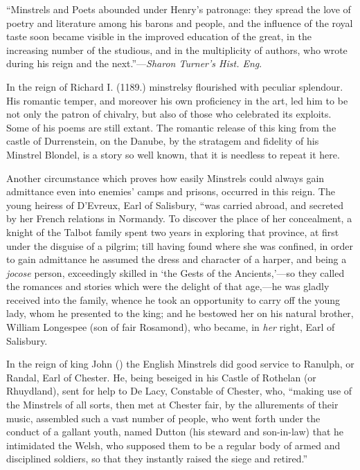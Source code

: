 “Minstrels and Poets abounded under Henry’s patronage: they spread the love
of poetry and literature among his barons and people, and the influence of the
royal taste soon became visible in the improved education of the great, in the
increasing number of the studious, and in the multiplicity of authors, who wrote
during his reign and the next.”—\textit{Sharon Turner’s Hist. Eng}.

In the reign of Richard I. (1189.) minstrelsy flourished with peculiar splendour.
His romantic temper, and moreover his own proficiency in the art, led him to be
not only the patron of chivalry, but also of those who celebrated its exploits.
Some of his poems are still extant. The romantic release of this king from the
castle of Durrenstein, on the Danube, by the stratagem and fidelity of his Minstrel
Blondel, is a story so well known, that it is needless to repeat it here.

Another circumstance which proves how easily Minstrels could always gain
admittance even into enemies’ camps and prisons, occurred in this reign. The
young heiress of D’Evreux, Earl of Salisbury,
\pagebreak
“was carried abroad, and secreted
by her French relations in Normandy. To discover the place of her concealment, 
a knight of the Talbot family spent two years in exploring that province, at first
under the disguise of a pilgrim; till having found where she was confined, in
order to gain admittance he assumed the dress and character of a harper, and
being a \textit{jocose} person, exceedingly skilled in ‘the Gests of the Ancients,’—so they
called the romances and stories which were the delight of that age,—he was gladly
received into the family, whence he took an opportunity to carry off the young
lady, whom he presented to the king; and he bestowed her on his natural brother,
William Longespee (son of fair Rosamond), who became, in \textit{her} right, Earl of
Salisbury.

In the reign of king John () the English Minstrels did good service
to Ranulph, or Randal, Earl of Chester. He, being beseiged in his Castle of
Rothelan (or Rhuydland), sent for help to De Lacy, Constable of Chester, who,
“making use of the Minstrels of all sorts, then met at Chester fair, by the allurements
of their music, assembled such a vast number of people, who went forth
under the conduct of a gallant youth, named Dutton (his steward and son-in-law)
that he intimidated the Welsh, who supposed them to be a regular body of armed
and disciplined soldiers, so that they instantly raised the siege and retired.”

